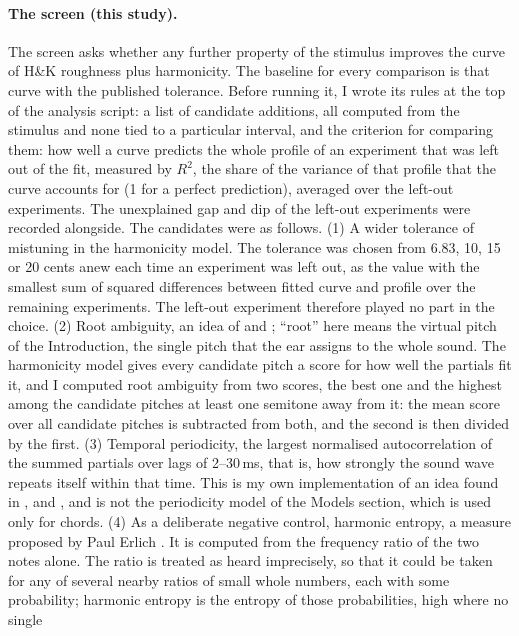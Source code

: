 \documentclass[11pt,a4paper]{article}
\newcommand{\HK}{H\&K}
\begin{document}
\paragraph{The screen (this study).}
The screen asks whether any further property of the stimulus improves the curve of \HK{} roughness
plus harmonicity. The baseline for every comparison is that curve with the published tolerance. Before running it, I wrote its rules at the top of the analysis script: a list of candidate additions, all
computed from the stimulus and none tied to a particular interval, and the criterion for
comparing them: how well a curve predicts the whole profile of an experiment that was left out
of the fit, measured by $R^2$, the share of the variance of that profile that the curve
accounts for (1 for a perfect prediction), averaged over the left-out experiments. The unexplained gap and
dip of the left-out experiments were recorded alongside. The candidates were as follows.
(1) A wider tolerance of mistuning in the harmonicity model. The tolerance was chosen from
6.83, 10, 15 or 20 cents anew each time an experiment was left out, as the value with the
smallest sum of squared differences between fitted curve and profile over the remaining
experiments. The left-out experiment therefore played no part in the choice. (2) Root ambiguity, an idea of \citet{terhardt1974}
and \citet{parncutt1988}; ``root'' here means the virtual pitch of the Introduction, the single pitch that the ear assigns to the whole
sound. The harmonicity model gives every candidate pitch a score for how well the partials fit
it, and I computed root ambiguity from two scores, the best one and the highest among the candidate pitches at least one semitone away from it: the mean score over all candidate pitches is subtracted from both, and the second is then divided by the first. (3) Temporal periodicity,
the largest normalised autocorrelation of the summed partials over lags of 2--30\,ms, that
is, how strongly the sound wave repeats itself within that time. This is my own
implementation of an idea found in \citet{pressnitzer2001}, \citet{stolzenburg2015} and
\citet{masina2022}, and is not the periodicity model of the Models section, which is used
only for chords. (4) As a deliberate negative control, harmonic entropy, a measure proposed by Paul Erlich \citep{erlich}. It is computed from the
frequency ratio of the two notes alone. The ratio is treated as heard imprecisely, so that it
could be taken for any of several nearby ratios of small whole numbers, each with some
probability; harmonic entropy is the entropy of those probabilities, high where no single
\end{document}
